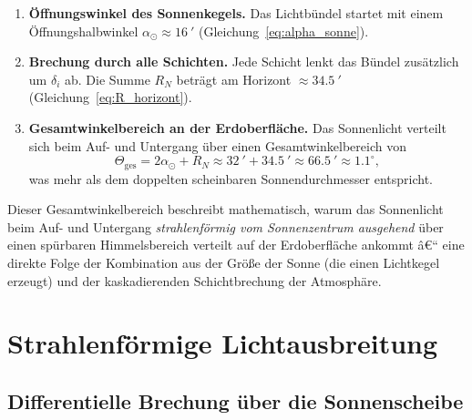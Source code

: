 ﻿\documentclass[12pt,a4paper]{article}
\begin{document}
\begin{enumerate}
  \item \textbf{Öffnungswinkel des Sonnenkegels.}
        Das Lichtbündel startet mit einem Öffnungshalbwinkel
        $\alpha_\odot \approx \SI{16}{\arcminute}$ (Gleichung~\ref{eq:alpha_sonne}).

  \item \textbf{Brechung durch alle Schichten.}
        Jede Schicht lenkt das Bündel zusätzlich um $\delta_i$ ab.
        Die Summe $R_N$ beträgt am Horizont $\approx\SI{34.5}{\arcminute}$
        (Gleichung~\ref{eq:R_horizont}).

  \item \textbf{Gesamtwinkelbereich an der Erdoberfläche.}
        Das Sonnenlicht verteilt sich beim Auf- und Untergang über
        einen Gesamtwinkelbereich von
        \begin{equation}
          \Theta_{\mathrm{ges}} = 2\alpha_\odot + R_N
                                \approx \SI{32}{\arcminute}
                                        + \SI{34.5}{\arcminute}
                                \approx \SI{66.5}{\arcminute}
                                \approx 1.1^{\circ},
          \label{eq:theta_ges}
        \end{equation}
        was mehr als dem doppelten scheinbaren Sonnendurchmesser
        entspricht.
\end{enumerate}

Dieser Gesamtwinkelbereich beschreibt mathematisch,
warum das Sonnenlicht beim Auf- und Untergang
\emph{strahlenförmig vom Sonnenzentrum ausgehend}
über einen spürbaren Himmelsbereich verteilt auf der Erdoberfläche
ankommt â€“ eine direkte Folge der Kombination aus der Größe der
Sonne (die einen Lichtkegel erzeugt) und der kaskadierenden
Schichtbrechung der Atmosphäre.

\section{Strahlenförmige Lichtausbreitung}
\label{sec:faecher}

\subsection{Differentielle Brechung über die Sonnenscheibe}
\end{document}
